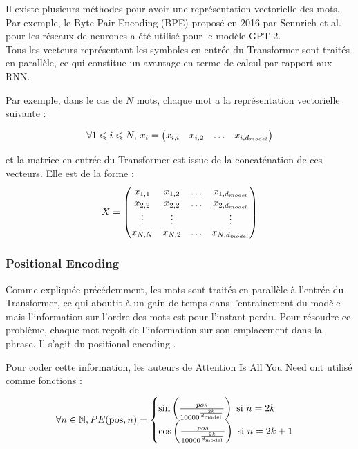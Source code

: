 Il existe plusieurs méthodes pour avoir une représentation vectorielle des mots.
Par exemple, le Byte Pair Encoding (BPE)\cite{sennrich2016bpe} proposé en 2016 par Sennrich et al. pour
les réseaux de neurones a été utilisé pour le modèle GPT-2\cite{radford2019gpt2}. \\


Tous les vecteurs représentant les symboles en entrée du Transformer sont traités en parallèle,
ce qui constitue un avantage en terme de calcul par rapport aux RNN.

Par exemple, dans le cas de $N$ mots,
chaque mot a la représentation vectorielle suivante :

\[ \forall 1 \leqslant i \leqslant N , \, x_i =
\begin{pmatrix}
  x_{i,i} & x_{i,2} & \ldots & x_{i,d_{model}}
\end{pmatrix}
 \]

et la matrice en entrée du Transformer est issue de la concaténation de ces vecteurs. Elle est de la forme :
\[ X =
\begin{pmatrix}
  x_{1,1} & x_{1,2} & \ldots & x_{1,d_{model}} \\
  x_{2,2} & x_{2,2} & \ldots & x_{2,d_{model}} \\
  \vdots  & \vdots  &        & \vdots \\
  x_{N,N} & x_{N,2} & \ldots & x_{N,d_{model}}
\end{pmatrix}
\]

\subsubsection{Positional Encoding}

Comme expliquée précédemment, les mots sont traités en parallèle à l'entrée du Transformer, ce qui aboutit à un gain de
temps dans l'entrainement du modèle mais l'information sur l'ordre des mots est pour l'instant perdu. Pour résoudre
ce problème, chaque mot reçoit de l'information sur son emplacement dans la phrase. Il s'agit du \og positional encoding \fg{}.

Pour coder cette information, les auteurs de \og Attention Is All You Need \fg{} \cite{vaswani2017attention} ont utilisé comme fonctions :

\[ \forall n \in \mathbb{N}, PE(\text{pos}, n) =
\begin{cases}
  \sin\left( \frac{pos}{10 000^{ \frac{2k}{d_\text{model}}}} \right) \text{ si } n = 2k\\
  \cos\left( \frac{pos}{10 000^{ \frac{2k}{d_\text{model}}}} \right) \text{ si } n = 2k+1 \\
\end{cases} \]

